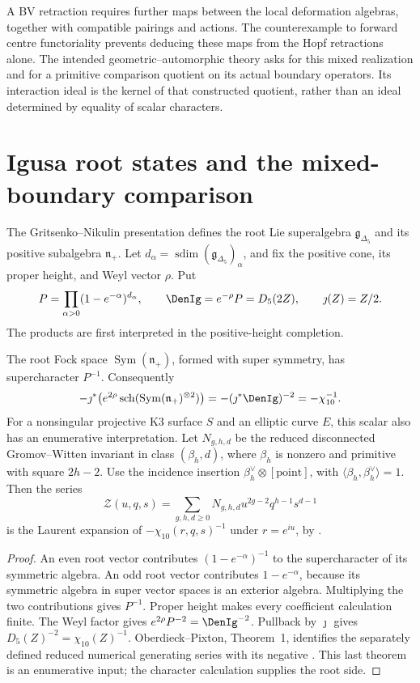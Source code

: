A BV retraction requires further maps between the local deformation algebras, together with compatible pairings and actions. The counterexample to forward centre functoriality prevents deducing these maps from the Hopf retractions alone. The intended geometric--automorphic theory asks for this mixed realization and for a primitive comparison quotient on its actual boundary operators. Its interaction ideal is the kernel of that constructed quotient, rather than an ideal determined by equality of scalar characters.

\chapter{Igusa root states and the mixed-boundary comparison}

The Gritsenko--Nikulin presentation defines the root Lie superalgebra
$\mathfrak g_{\Delta_5}$ and its positive subalgebra $\mathfrak n_+$.
Let $d_\alpha=\operatorname{sdim}(\mathfrak g_{\Delta_5})_\alpha$,
and fix the positive cone, its proper height, and Weyl vector $\rho$.
Put
\[
 P=\prod_{\alpha>0}(1-e^{-\alpha})^{d_\alpha},\qquad
 \DenIg=e^{-\rho}P=D_5(2Z),\qquad \jmath(Z)=Z/2.
\]
The products are first interpreted in the positive-height completion.

\begin{theorem}
The root Fock space $\operatorname{Sym}(\mathfrak n_+)$, formed with
super symmetry, has supercharacter $P^{-1}$. Consequently
\[
 -\jmath^*\!\left(e^{2\rho}
   \operatorname{sch}(\operatorname{Sym}(\mathfrak n_+)^{\otimes2})\right)
 =-(\jmath^*\DenIg)^{-2}=-\chi_{10}^{-1}.
\]
For a nonsingular projective K3 surface $S$ and an elliptic curve $E$, this scalar also has an enumerative interpretation. Let $N_{g,h,d}$ be the reduced disconnected Gromov--Witten invariant in class $(\beta_h,d)$, where $\beta_h$ is nonzero and primitive with square $2h-2$. Use the incidence insertion $\beta_h^\vee\otimes[\mathrm{point}]$, with $\langle\beta_h,\beta_h^\vee\rangle=1$. Then the series
\[
 \mathcal Z(u,q,s)=\sum_{g,h,d\ge0}N_{g,h,d}u^{2g-2}q^{h-1}s^{d-1}
\]
is the Laurent expansion of $-\chi_{10}(r,q,s)^{-1}$ under $r=e^{iu}$, by \cite[Theorem~1]{OP}.
\end{theorem}
\begin{proof}
An even root vector contributes $(1-e^{-\alpha})^{-1}$ to the
supercharacter of its symmetric algebra. An odd root vector contributes
$1-e^{-\alpha}$, because its symmetric algebra in super vector spaces
is an exterior algebra. Multiplying the two contributions gives
$P^{-1}$. Proper height makes every coefficient calculation finite.
The Weyl factor gives $e^{2\rho}P^{-2}=\DenIg^{-2}$.
Pullback by $\jmath$ gives $D_5(Z)^{-2}=\chi_{10}(Z)^{-1}$.
Oberdieck--Pixton, Theorem~1, identifies the separately defined reduced numerical generating series with its negative \cite{OP}. This last theorem
is an enumerative input; the character calculation supplies the root side.
\end{proof}


